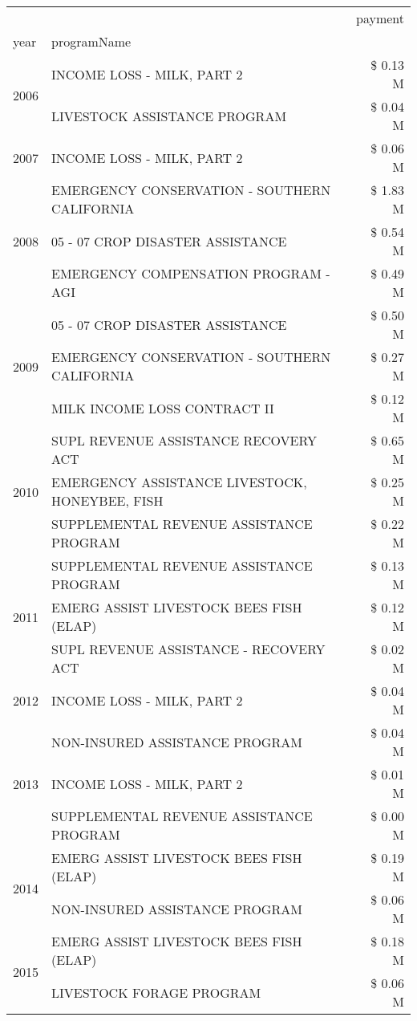 \begin{tabular}{llr}
\toprule
 &  & payment \\
year & programName &  \\
\midrule
\multirow[t]{2}{*}{2006} & INCOME LOSS - MILK, PART 2 & \$ 0.13 M \\
 & LIVESTOCK ASSISTANCE PROGRAM & \$ 0.04 M \\
\cline{1-3}
2007 & INCOME LOSS - MILK, PART 2 & \$ 0.06 M \\
\cline{1-3}
\multirow[t]{3}{*}{2008} & EMERGENCY CONSERVATION - SOUTHERN CALIFORNIA & \$ 1.83 M \\
 & 05 - 07 CROP DISASTER ASSISTANCE & \$ 0.54 M \\
 & EMERGENCY COMPENSATION PROGRAM - AGI & \$ 0.49 M \\
\cline{1-3}
\multirow[t]{3}{*}{2009} & 05 - 07 CROP DISASTER ASSISTANCE & \$ 0.50 M \\
 & EMERGENCY CONSERVATION - SOUTHERN CALIFORNIA & \$ 0.27 M \\
 & MILK INCOME LOSS CONTRACT II & \$ 0.12 M \\
\cline{1-3}
\multirow[t]{3}{*}{2010} & SUPL REVENUE ASSISTANCE RECOVERY ACT & \$ 0.65 M \\
 & EMERGENCY ASSISTANCE LIVESTOCK, HONEYBEE, FISH & \$ 0.25 M \\
 & SUPPLEMENTAL REVENUE ASSISTANCE PROGRAM & \$ 0.22 M \\
\cline{1-3}
\multirow[t]{3}{*}{2011} & SUPPLEMENTAL REVENUE ASSISTANCE PROGRAM & \$ 0.13 M \\
 & EMERG ASSIST LIVESTOCK BEES FISH (ELAP) & \$ 0.12 M \\
 & SUPL REVENUE ASSISTANCE - RECOVERY ACT & \$ 0.02 M \\
\cline{1-3}
2012 & INCOME LOSS - MILK, PART 2 & \$ 0.04 M \\
\cline{1-3}
\multirow[t]{3}{*}{2013} & NON-INSURED ASSISTANCE PROGRAM & \$ 0.04 M \\
 & INCOME LOSS - MILK, PART 2 & \$ 0.01 M \\
 & SUPPLEMENTAL REVENUE ASSISTANCE PROGRAM & \$ 0.00 M \\
\cline{1-3}
\multirow[t]{2}{*}{2014} & EMERG ASSIST LIVESTOCK BEES FISH (ELAP) & \$ 0.19 M \\
 & NON-INSURED ASSISTANCE PROGRAM & \$ 0.06 M \\
\cline{1-3}
\multirow[t]{3}{*}{2015} & EMERG ASSIST LIVESTOCK BEES FISH (ELAP) & \$ 0.18 M \\
 & LIVESTOCK FORAGE PROGRAM & \$ 0.06 M \\

\end{tabular}
